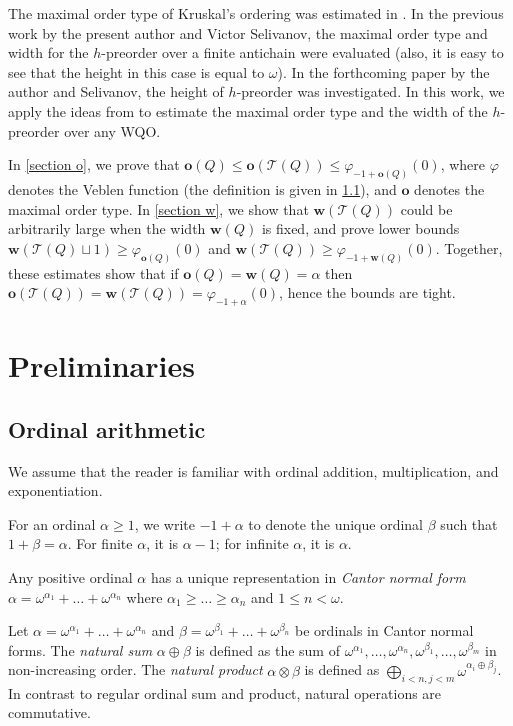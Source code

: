 \documentclass[runningheads]{llncs}
\let \leq \leqslant
\let \geq \geqslant
\let \phi \varphi
\def \T {\mathcal{T}}
\def \o {\textbf{o}}
\def \w {\textbf{w}}
\begin{document}
The maximal order type of Kruskal's ordering was estimated in \cite{Schmidt2020}. In the previous work \cite{Selivanov2025} by the present author and Victor Selivanov, the maximal order type and width for the $h$-preorder over a finite antichain were evaluated (also, it is easy to see that the height in this case is equal to $\omega$). In the forthcoming paper by the author and Selivanov, the height of $h$-preorder was investigated. In this work, we apply the ideas from \cite{Selivanov2025,Friedman2023} to estimate the maximal order type and the width of the $h$-preorder over any WQO.

In \cref{section o}, we prove that $\o(Q) \leq \o(\T(Q)) \leq \phi_{-1+\o(Q)}(0)$, where $\phi$ denotes the Veblen function (the definition is given in \cref{arith}), and $\o$ denotes the maximal order type. In \cref{section w}, we show that $\w(\T(Q))$ could be arbitrarily large when the width $\w(Q)$ is fixed, and prove lower bounds $\w(\T(Q) \sqcup 1) \geq \phi_{\o(Q)}(0)$ and $\w(\T(Q)) \geq \phi_{-1+\w(Q)}(0)$. Together, these estimates show that if $\o(Q) = \w(Q) = \alpha$ then $\o(\T(Q)) = \w(\T(Q)) = \phi_{-1+\alpha}(0)$, hence the bounds are tight.

\section{Preliminaries}

\subsection{Ordinal arithmetic}\label{arith}

We assume that the reader is familiar with ordinal addition, multiplication, and exponentiation.

For an ordinal $\alpha \geq 1$, we write $-1+\alpha$ to denote the unique ordinal $\beta$ such that $1+\beta = \alpha$. For finite $\alpha$, it is $\alpha-1$; for infinite $\alpha$, it is $\alpha$.

Any positive ordinal $\alpha$ has a unique representation in \textit{Cantor normal form} $\alpha = \omega^{\alpha_1}+\dots+\omega^{\alpha_n}$ where $\alpha_1 \geq \dots \geq \alpha_n$ and $1 \leq n < \omega$.

Let $\alpha = \omega^{\alpha_1}+\dots+\omega^{\alpha_n}$ and $\beta = \omega^{\beta_1}+\dots+\omega^{\beta_n}$ be ordinals in Cantor normal forms. The \textit{natural sum} $\alpha \oplus \beta$ is defined as the sum of $\omega^{\alpha_1},\dots,\omega^{\alpha_n},\omega^{\beta_1},\dots,\omega^{\beta_m}$ in non-increasing order. The \textit{natural product} $\alpha \otimes \beta$ is defined as $\bigoplus_{i<n,j<m} \omega^{\alpha_i\oplus\beta_j}$. In contrast to regular ordinal sum and product, natural operations are commutative.
\end{document}
